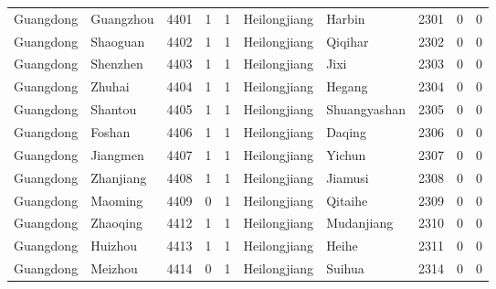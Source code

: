 \documentclass[12pt]{article}
\begin{document}
\begin{table}[!htbp]
\begin{adjustbox}{width=\textwidth, totalheight=\baselineskip,keepaspectratio}
\begin{tabular}{llllllllll}
Guangdong & Guangzhou & 4401 & 1   & 1   & Heilongjiang & Harbin        & 2301 & 0   & 0   \\
Guangdong & Shaoguan  & 4402 & 1   & 1   & Heilongjiang & Qiqihar       & 2302 & 0   & 0   \\
Guangdong & Shenzhen  & 4403 & 1   & 1   & Heilongjiang & Jixi          & 2303 & 0   & 0   \\
Guangdong & Zhuhai    & 4404 & 1   & 1   & Heilongjiang & Hegang        & 2304 & 0   & 0   \\
Guangdong & Shantou   & 4405 & 1   & 1   & Heilongjiang & Shuangyashan  & 2305 & 0   & 0   \\
Guangdong & Foshan    & 4406 & 1   & 1   & Heilongjiang & Daqing        & 2306 & 0   & 0   \\
Guangdong & Jiangmen  & 4407 & 1   & 1   & Heilongjiang & Yichun        & 2307 & 0   & 0   \\
Guangdong & Zhanjiang & 4408 & 1   & 1   & Heilongjiang & Jiamusi       & 2308 & 0   & 0   \\
Guangdong & Maoming   & 4409 & 0   & 1   & Heilongjiang & Qitaihe       & 2309 & 0   & 0   \\
Guangdong & Zhaoqing  & 4412 & 1   & 1   & Heilongjiang & Mudanjiang    & 2310 & 0   & 0   \\
Guangdong & Huizhou   & 4413 & 1   & 1   & Heilongjiang & Heihe         & 2311 & 0   & 0   \\
Guangdong & Meizhou   & 4414 & 0   & 1   & Heilongjiang & Suihua        & 2314 & 0   & 0  
\end{tabular}
\end{adjustbox}
\end{table}
\end{document}
